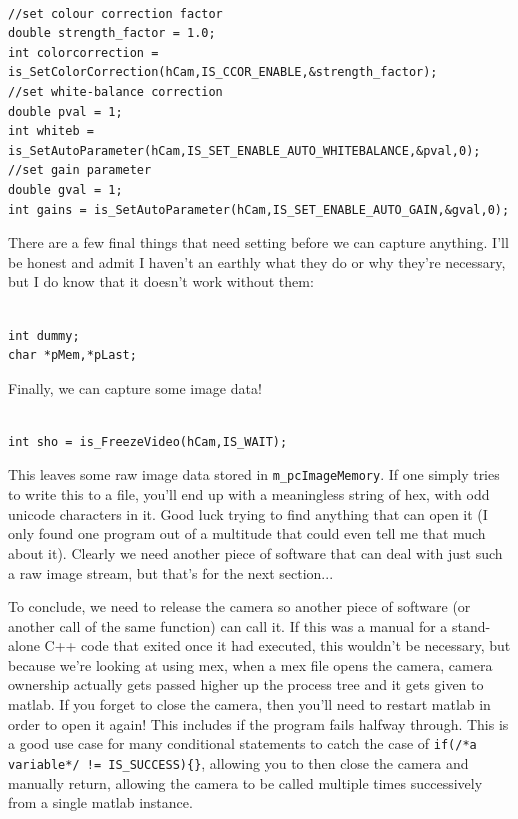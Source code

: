 \documentclass[12pt,a4paper]{article}
\begin{document}
\lstset{language=C++}
\begin{lstlisting}

//set colour correction factor
double strength_factor = 1.0;
int colorcorrection = is_SetColorCorrection(hCam,IS_CCOR_ENABLE,&strength_factor);
//set white-balance correction
double pval = 1;
int whiteb = is_SetAutoParameter(hCam,IS_SET_ENABLE_AUTO_WHITEBALANCE,&pval,0);
//set gain parameter
double gval = 1;
int gains = is_SetAutoParameter(hCam,IS_SET_ENABLE_AUTO_GAIN,&gval,0);

\end{lstlisting}

There are a few final things that need setting before we can capture anything. I'll be honest and admit I haven't an earthly what they do or why they're necessary, but I do know that it doesn't work without them:

\lstset{language=C++}
\begin{lstlisting}

int dummy;
char *pMem,*pLast;

\end{lstlisting}

Finally, we can capture some image data!

\lstset{language=C++}
\begin{lstlisting}

int sho = is_FreezeVideo(hCam,IS_WAIT);

\end{lstlisting}

This leaves some raw image data stored in \texttt{m\_pcImageMemory}. If one simply tries to write this to a file, you'll end up with a meaningless string of hex, with odd unicode characters in it. Good luck trying to find anything that can open it (I only found one program out of a multitude that could even tell me that much about it). Clearly we need another piece of software that can deal with just such a raw image stream, but that's for the next section...

To conclude, we need to release the camera so another piece of software (or another call of the same function) can call it. If this was a manual for a stand-alone C++ code that exited once it had executed, this wouldn't be necessary, but because we're looking at using mex, when a mex file opens the camera, camera ownership actually gets passed higher up the process tree and it gets given to matlab. If you forget to close the camera, then you'll need to restart matlab in order to open it again! This includes if the program fails halfway through. This is a good use case for many conditional statements to catch the case of \texttt{if(\color{mygreen}/*a variable*/ \color{black} != IS\_SUCCESS)\{\}}, allowing you to then close the camera and manually return, allowing the camera to be called multiple times successively from a single matlab instance.
\end{document}
